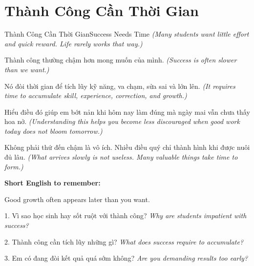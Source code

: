 \section{Thành Công Cần Thời Gian}
\begin{truyen}{Thành Công Cần Thời Gian}{Success Needs Time}
\textit{(Many students want little effort and quick reward. Life rarely works that way.)}

Thành công thường chậm hơn mong muốn của mình.
\textit{(Success is often slower than we want.)}

Nó đòi thời gian để tích lũy kỹ năng, va chạm, sửa sai và lớn lên.
\textit{(It requires time to accumulate skill, experience, correction, and growth.)}

Hiểu điều đó giúp em bớt nản khi hôm nay làm đúng mà ngày mai vẫn chưa thấy hoa nở.
\textit{(Understanding this helps you become less discouraged when good work today does not bloom tomorrow.)}
\end{truyen}

\begin{baihoc}
Không phải thứ đến chậm là vô ích. Nhiều điều quý chỉ thành hình khi được nuôi đủ lâu.
\textit{(What arrives slowly is not useless. Many valuable things take time to form.)}
\end{baihoc}

\begin{ghinhoanh}
\textbf{Short English to remember:}

Good growth often appears later than you want.

\end{ghinhoanh}

\begin{tuhocnhanh}
1. Vì sao học sinh hay sốt ruột với thành công? \textit{Why are students impatient with success?}

2. Thành công cần tích lũy những gì? \textit{What does success require to accumulate?}

3. Em có đang đòi kết quả quá sớm không? \textit{Are you demanding results too early?}
\end{tuhocnhanh}
\ngancach

